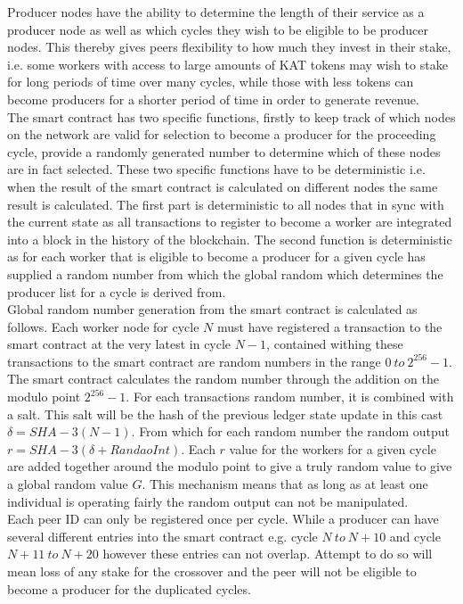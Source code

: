 Producer nodes have the ability to determine the length of their service as a producer node as well as which cycles they wish to be eligible to be producer nodes. This thereby gives peers flexibility to how much they invest in their stake, i.e. some workers with access to large amounts of KAT tokens may wish to stake for long periods of time over many cycles, while those with less tokens can become producers for a shorter period of time in order to generate revenue. \\

The smart contract has two specific functions, firstly to keep track of which nodes on the network are valid for selection to become a producer for the proceeding cycle, provide a randomly generated number to determine which of these nodes are in fact selected. These two specific functions have to be deterministic i.e. when the result of the smart contract is calculated on different nodes the same result is calculated. The first part is deterministic to all nodes that in sync with the current state as all transactions to register to become a worker are integrated into a block in the history of the blockchain. The second function is deterministic as for each worker that is eligible to become a producer for a given cycle has supplied a random number from which the global random which determines the producer list for a cycle is derived from. \\

Global random number generation from the smart contract is calculated as follows. Each worker node for cycle $N$ must have registered a transaction to the smart contract at the very latest in cycle $N-1$, contained withing these transactions to the smart contract are random numbers in the range $0~to~2^{256} - 1$. The smart contract calculates the random number through the addition on the modulo point $2^{256} - 1$. For each transactions random number, it is combined with a salt. This salt will be the hash of the previous ledger state update in this cast $\delta = SHA-3(N-1)$. From which for each random number the random output $r = SHA-3(\delta + RandaoInt)$. Each $r$ value for the workers for a given cycle are added together around the modulo point to give a truly random value to give a global random value $G$. This mechanism means that as long as at least one individual is operating fairly the random output can not be manipulated. \\

Each peer ID can only be registered once per cycle. While a producer can have several different entries into the smart contract e.g. cycle $N~to~N+10$ and cycle $N+11~to~N+20$ however these entries can not overlap. Attempt to do so will mean loss of any stake for the crossover and the peer will not be eligible to become a producer for the duplicated cycles. \\

